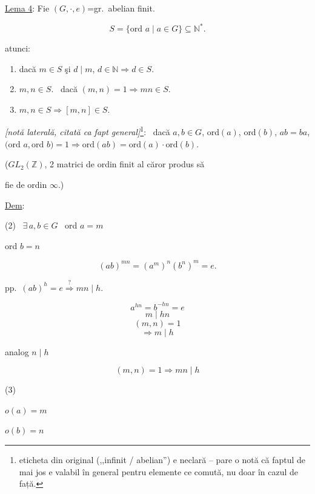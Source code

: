 \documentclass[12pt]{article}
\begin{document}
\noindent\underline{Lema 4}: Fie $(G,\cdot,e)$=gr.\ abelian finit.

\[
S=\{\text{ord } a \mid a\in G\} \subseteq \mathbb{N}^*.
\]

\bigskip
\noindent atunci:

\begin{enumerate}
\item[(1)] dacă $m\in S$ şi $d\mid m$, $d\in\mathbb{N} \Rightarrow d\in S$.
\item[(2)] $m,n\in S$. \ dacă $(m,n)=1 \Rightarrow mn\in S$.
\item[(3)] $m,n\in S \Rightarrow [m,n]\in S$.
\end{enumerate}

\bigskip
\noindent\textit{[notă laterală, citată ca fapt general]}\footnote{eticheta din original (,,infinit / abelian'') e neclară -- pare o notă că faptul de mai jos e valabil în general pentru elemente ce comută, nu doar în cazul de față.}: \ dacă $a,b\in G$, ord$(a)$, ord$(b)$, $ab=ba$, $\big(\text{ord } a,\text{ord } b\big)=1 \Rightarrow \text{ord}(ab)=\text{ord}(a)\cdot\text{ord}(b)$.

\bigskip
\noindent\big($GL_2(\mathbb{Z})$, 2 matrici de ordin finit al căror produs să

\noindent fie de ordin $\infty$.\big)

\bigskip
\noindent\underline{Dem}:

\bigskip
\noindent (2) \ $\exists\, a,b\in G$ \ ord $a=m$

\noindent ord $b=n$

\[
(ab)^{mn} = (a^m)^n(b^n)^m = e.
\]

\noindent pp.\ $(ab)^h=e \overset{?}{\Longrightarrow} mn\mid h$.

\[
a^{hn}=b^{-hn}=e
\]
\[
m\mid hn
\]
\[
(m,n)=1
\]
\[
\Rightarrow m\mid h
\]

\noindent analog $n\mid h$

\[
(m,n)=1 \Rightarrow mn\mid h
\]

\bigskip
\noindent (3)

\noindent $o(a)=m$

\noindent $o(b)=n$
\end{document}
